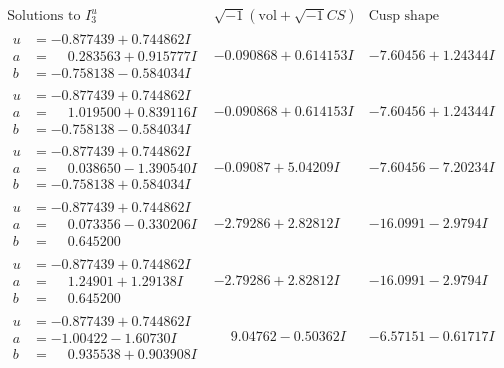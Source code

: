 \documentclass[1p]{elsarticle_modified}
\theoremstyle{definition}
\newcommand{\I}{\sqrt{-1}}
\begin{document}
$$\begin{array}{c|c|c}  
\text{Solutions to }I^u_{3}& \I (\text{vol} + \sqrt{-1}CS) & \text{Cusp shape}\\
 \hline 
\begin{aligned}
u &= -0.877439 + 0.744862 I \\
a &= \phantom{-}0.283563 + 0.915777 I \\
b &= -0.758138 - 0.584034 I\end{aligned}
 & -0.090868 + 0.614153 I & -7.60456 + 1.24344 I \\ \hline\begin{aligned}
u &= -0.877439 + 0.744862 I \\
a &= \phantom{-}1.019500 + 0.839116 I \\
b &= -0.758138 - 0.584034 I\end{aligned}
 & -0.090868 + 0.614153 I & -7.60456 + 1.24344 I \\ \hline\begin{aligned}
u &= -0.877439 + 0.744862 I \\
a &= \phantom{-}0.038650 - 1.390540 I \\
b &= -0.758138 + 0.584034 I\end{aligned}
 & -0.09087 + 5.04209 I & -7.60456 - 7.20234 I \\ \hline\begin{aligned}
u &= -0.877439 + 0.744862 I \\
a &= \phantom{-}0.073356 - 0.330206 I \\
b &= \phantom{-}0.645200\phantom{ +0.000000I}\end{aligned}
 & -2.79286 + 2.82812 I & -16.0991 - 2.9794 I \\ \hline\begin{aligned}
u &= -0.877439 + 0.744862 I \\
a &= \phantom{-}1.24901 + 1.29138 I \\
b &= \phantom{-}0.645200\phantom{ +0.000000I}\end{aligned}
 & -2.79286 + 2.82812 I & -16.0991 - 2.9794 I \\ \hline\begin{aligned}
u &= -0.877439 + 0.744862 I \\
a &= -1.00422 - 1.60730 I \\
b &= \phantom{-}0.935538 + 0.903908 I\end{aligned}
 & \phantom{-}9.04762 - 0.50362 I & -6.57151 - 0.61717 I \\ \hline\begin{aligned}

\end{aligned}
\end{array}$$
\end{document}

